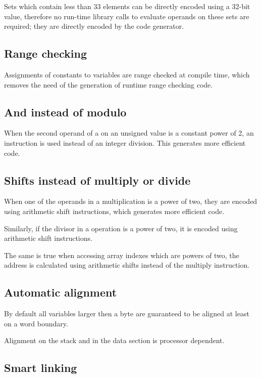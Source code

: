 Sets which contain less than 33 elements can be directly encoded
using a 32-bit value, therefore no run-time library calls to
evaluate operands on these sets are required; they are directly encoded
by the code generator.

\subsection{Range checking}

Assignments of constants to variables are range checked at compile
time, which removes the need of the generation of runtime range checking
code.

\subsection{And instead of modulo}

When the second operand of a  on an unsigned value is a constant
power of 2, an  instruction is used instead of an integer division.
This generates more efficient code.

\subsection{Shifts instead of multiply or divide}

When one of the operands in a multiplication is a power of
two, they are encoded using arithmetic shift instructions,
which generates more efficient code.

Similarly, if the divisor in a  operation is a power
of two, it is encoded using arithmetic shift instructions.

The same is true when accessing array indexes which are
powers of two, the address is calculated using arithmetic
shifts instead of the multiply instruction.

\subsection{Automatic alignment}

By default all variables larger then a byte are guaranteed to be aligned
at least on a word boundary.

Alignment on the stack and in the data section is processor dependent.

\subsection{Smart linking}

